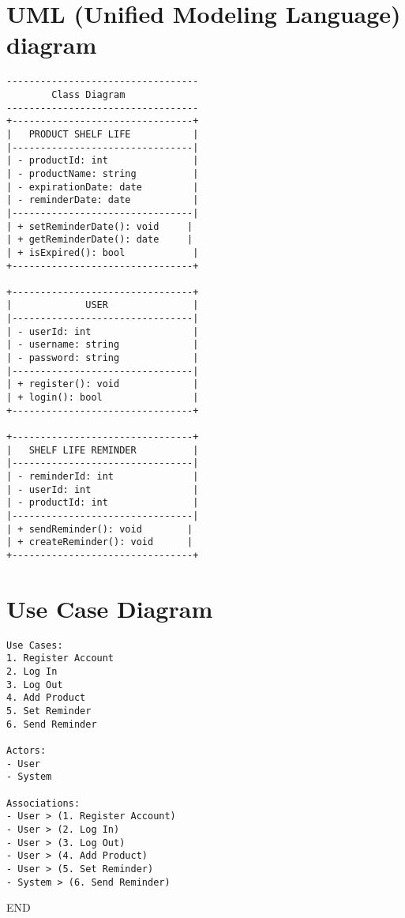 \section{UML (Unified Modeling Language) diagram}
\begin{verbatim}
----------------------------------
        Class Diagram
----------------------------------
+--------------------------------+
|   PRODUCT SHELF LIFE           |
|--------------------------------|
| - productId: int               |
| - productName: string          |
| - expirationDate: date         |
| - reminderDate: date           |
|--------------------------------|
| + setReminderDate(): void     |
| + getReminderDate(): date     |
| + isExpired(): bool            |
+--------------------------------+

+--------------------------------+
|             USER               |
|--------------------------------|
| - userId: int                  |
| - username: string             |
| - password: string             |
|--------------------------------|
| + register(): void             |
| + login(): bool                |
+--------------------------------+

+--------------------------------+
|   SHELF LIFE REMINDER          |
|--------------------------------|
| - reminderId: int              |
| - userId: int                  |
| - productId: int               |
|--------------------------------|
| + sendReminder(): void        |
| + createReminder(): void      |
+--------------------------------+

\end{verbatim}
\section{Use Case Diagram}
\begin{verbatim}
Use Cases:
1. Register Account
2. Log In
3. Log Out
4. Add Product
5. Set Reminder
6. Send Reminder

Actors:
- User
- System

Associations:
- User > (1. Register Account)
- User > (2. Log In)
- User > (3. Log Out)
- User > (4. Add Product)
- User > (5. Set Reminder)
- System > (6. Send Reminder)

\end{verbatim} 
END \\ \\ \\ \\ \\ \\ \\

